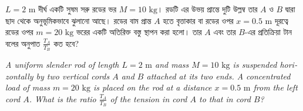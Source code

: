 \documentclass[12pt, a4paper]{article}
\begin{document}
\begin{tcolorbox}[questionbox={প্রশ্ন (Question) 45}]
    \noindent
    $L = 2\text{ m}$ দীর্ঘ একটি সুষম সরু রডের ভর $M = 10\text{ kg}$। রডটি এর উভয় প্রান্তে দুটি উল্লম্ব তার $A$ ও $B$ দ্বারা ছাদ থেকে অনুভূমিকভাবে ঝুলানো আছে। রডের বাম প্রান্ত $A$ হতে বৃত্তাকার বা রডের ওপর $x = 0.5\text{ m}$ দূরত্বে রডের ওপর $m = 20\text{ kg}$ ভরের একটি অতিরিক্ত বস্তু স্থাপন করা হলো। তার $A$ এবং তার $B$-এর প্রতিক্রিয়া টান বলের অনুপাত $\frac{T_A}{T_B}$ কত হবে?
    
    \vspace{0.8em}
    \begin{english}
    \noindent\textit{\color{darkgray}
    A uniform slender rod of length $L = 2\text{ m}$ and mass $M = 10\text{ kg}$ is suspended horizontally by two vertical cords $A$ and $B$ attached at its two ends. A concentrated load of mass $m = 20\text{ kg}$ is placed on the rod at a distance $x = 0.5\text{ m}$ from the left cord $A$. What is the ratio $\frac{T_A}{T_B}$ of the tension in cord $A$ to that in cord $B$?
    }
    \end{english}
\end{tcolorbox}

\vspace{1em}
\begin{center}
\end{center}
\vspace{1em}
\end{document}

